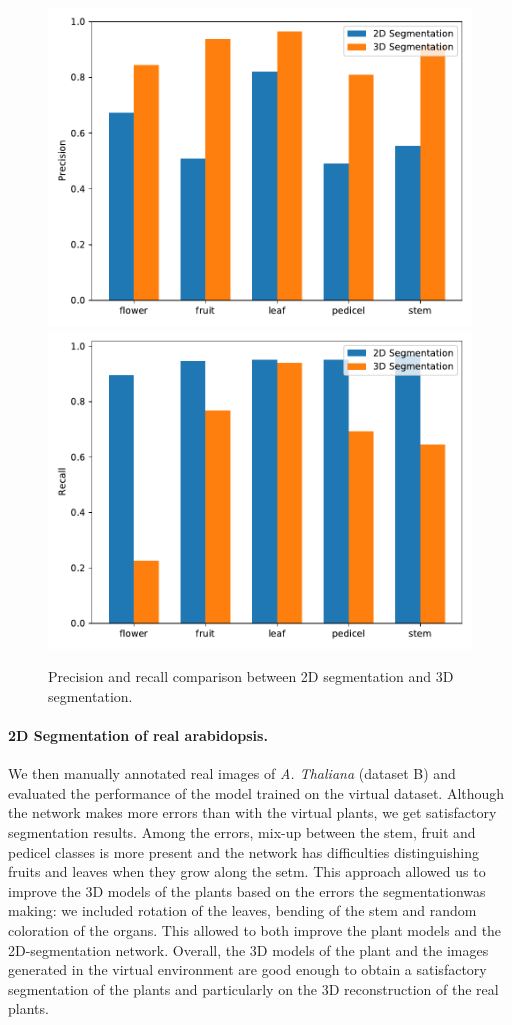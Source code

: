 \begin{figure}[h!]
    \centering \includegraphics[width = 0.5\linewidth]{figures/eval_precision.pdf}\includegraphics[width = 0.5\linewidth]{figures/eval_recall.pdf}
    \caption{Precision and recall comparison between 2D segmentation and 3D
segmentation.} \label{fig:prec_recall_2d_3d}
\end{figure}


\paragraph{2D Segmentation of real arabidopsis.}
 We then manually annotated real images of \emph{A. Thaliana} (dataset B) and evaluated the performance of the model trained on the virtual dataset. Although the network makes more errors than with the virtual plants, we get satisfactory segmentation results. Among the errors, mix-up between the stem, fruit and pedicel classes is more present and the network has difficulties distinguishing fruits and leaves when they grow along the setm. This approach allowed us to improve the 3D models of the plants based on the errors the segmentationwas making: we included rotation of the leaves, bending of the stem and random coloration of the organs. This allowed to both improve the plant models and the 2D-segmentation network.  Overall, the 3D models of the plant and the images generated in the virtual environment are good enough to obtain a satisfactory segmentation of the plants and particularly on the 3D reconstruction of the real plants.\\


